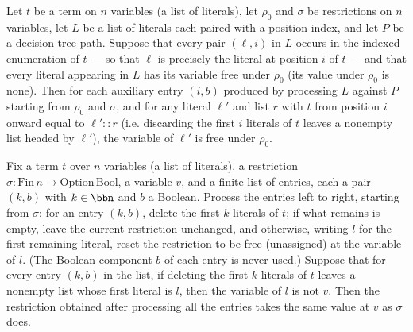 \begin{lemma}
\label{SwitchingLemma.processClauseLits_aux_vars_free}
\leanok
{}
Let $t$ be a term on $n$ variables (a list of literals), let $\rho_0$ and $\sigma$ be
restrictions on $n$ variables, let $L$ be a list of literals each paired with a position
index, and let $P$ be a decision-tree path. Suppose that every pair $(\ell, i)$ in $L$
occurs in the indexed enumeration of $t$ — so that $\ell$ is precisely the literal at
position $i$ of $t$ — and that every literal appearing in $L$ has its variable free
under $\rho_0$ (its value under $\rho_0$ is $\mathrm{none}$). Then for each auxiliary
entry $(i, b)$ produced by processing $L$ against $P$ starting from $\rho_0$ and
$\sigma$, and for any literal $\ell'$ and list $r$ with $t$ from position $i$ onward
equal to $\ell' :: r$ (i.e. discarding the first $i$ literals of $t$ leaves a nonempty
list headed by $\ell'$), the variable of $\ell'$ is free under $\rho_0$.
\end{lemma}

\begin{lemma}
\label{SwitchingLemma.foldl_sigma_stable}
\leanok
{}
Fix a term $t$ over $n$ variables (a list of literals), a restriction $\sigma :
\mathrm{Fin}\,n \to \mathrm{Option}\,\mathrm{Bool}$, a variable $v$, and a finite list
of entries, each a pair $(k, b)$ with $k \in \bbn$ and $b$ a Boolean. Process the
entries left to right, starting from $\sigma$: for an entry $(k, b)$, delete the first
$k$ literals of $t$; if what remains is empty, leave the current restriction unchanged,
and otherwise, writing $l$ for the first remaining literal, reset the restriction to be
free (unassigned) at the variable of $l$. (The Boolean component $b$ of each entry is
never used.) Suppose that for every entry $(k, b)$ in the list, if deleting the first
$k$ literals of $t$ leaves a nonempty list whose first literal is $l$, then the variable
of $l$ is not $v$. Then the restriction obtained after processing all the entries takes
the same value at $v$ as $\sigma$ does.
\end{lemma}


